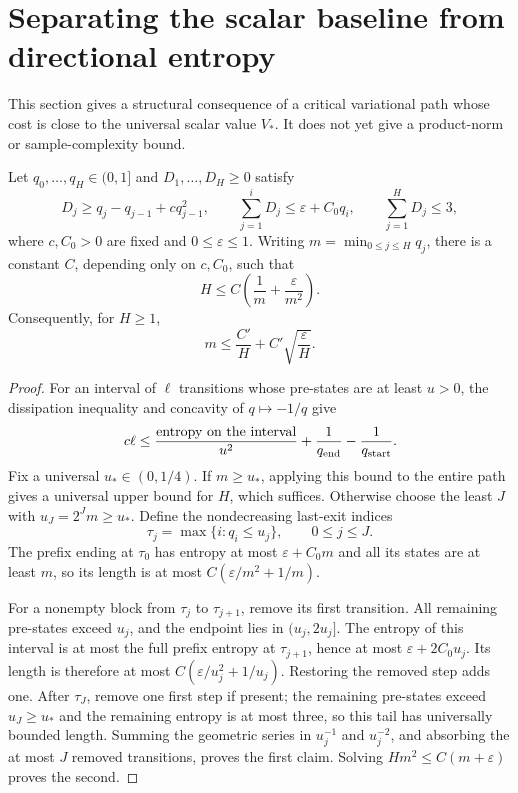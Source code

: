 \section{Separating the scalar baseline from directional entropy}
\label{sec:critical-near-baseline-decomposition}

This section gives a structural consequence of a critical variational
path whose cost is close to the universal scalar value $V_*$. It does
not yet give a product-norm or sample-complexity bound.

\begin{lemma}
\label{lem:critical-additive-occupation}
Let $q_0,\ldots,q_H\in(0,1]$ and $D_1,\ldots,D_H\ge0$ satisfy
\[
 D_j\ge q_j-q_{j-1}+cq_{j-1}^2,\qquad
 \sum_{j=1}^iD_j\le\varepsilon+C_0q_i,
 \qquad \sum_{j=1}^H D_j\le3,
\]
where $c,C_0>0$ are fixed and $0\le\varepsilon\le1$.
Writing $m=\min_{0\le j\le H}q_j$, there is a constant $C$,
depending only on $c,C_0$, such that
\[
 H\le C\left(\frac1m+\frac{\varepsilon}{m^2}\right).
\]
Consequently, for $H\ge1$,
\[
 m\le\frac{C'}H+C'\sqrt{\frac{\varepsilon}H}.
\]
\end{lemma}

\begin{proof}
For an interval of $\ell$ transitions whose pre-states are at least
$u>0$, the dissipation inequality and concavity of $q\mapsto-1/q$
give
\[
 c\ell\le
 \frac{\text{entropy on the interval}}{u^2}
 +\frac1{q_{\rm end}}-\frac1{q_{\rm start}}.
\]
Fix a universal $u_*\in(0,1/4)$. If $m\ge u_*$, applying this
bound to the entire path gives a universal upper bound for $H$,
which suffices. Otherwise choose the least $J$ with
$u_J=2^Jm\ge u_*$. Define the nondecreasing last-exit indices
\[
 \tau_j=\max\{i:q_i\le u_j\},\qquad 0\le j\le J.
\]
The prefix ending at $\tau_0$ has entropy at most
$\varepsilon+C_0m$ and all its states are at least $m$, so its
length is at most $C(\varepsilon/m^2+1/m)$.

For a nonempty block from $\tau_j$ to $\tau_{j+1}$, remove its
first transition. All remaining pre-states exceed $u_j$, and the
endpoint lies in $(u_j,2u_j]$. The entropy of this interval is at
most the full prefix entropy at $\tau_{j+1}$, hence at most
$\varepsilon+2C_0u_j$. Its length is therefore at most
$C(\varepsilon/u_j^2+1/u_j)$. Restoring the removed step adds one.
After $\tau_J$, remove one first step if present; the remaining
pre-states exceed $u_J\ge u_*$ and the remaining entropy is at
most three, so this tail has universally bounded length.
Summing the geometric series in $u_j^{-1}$ and $u_j^{-2}$,
and absorbing the at most $J$ removed transitions, proves the first
claim. Solving $Hm^2\le C(m+\varepsilon)$ proves the second.
\end{proof}

